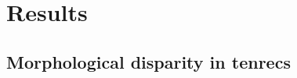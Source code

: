\documentclass[12pt,a4paper]{article}
\begin{document}

\section{Results}

\subsection{Morphological disparity in tenrecs} 













\end{document}
